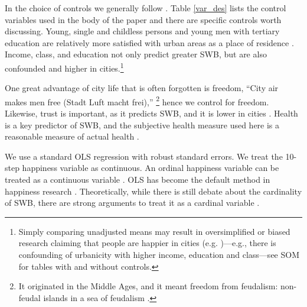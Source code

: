 \documentclass[10pt, letterpaper]{article}
\begin{document}




 
In the choice of controls we generally follow \citet{aok20}. Table \ref{var_des} lists the control variables used in the body of the
paper and there are specific controls worth discussing.
%
 Young, single and childless persons and young men with tertiary education are
 relatively more satisfied with urban areas as a place of residence \citep{anon-regional-studies-19}.
Income, class,  and education  not only predict greater
 SWB, but are also confounded and higher in cities.\footnote{Simply comparing
   unadjusted means may result in oversimplified or biased research claiming
   that people are happier in cities (e.g. \citep{burger20})---e.g., there is
   confounding of urbanicity with higher income, education and class---see SOM for tables with and without controls.} 

One great advantage of city life that is often forgotten is freedom, ``City
 air makes men free (Stadt Luft macht frei),'' \citep[p. 12]{park84}\footnote{It originated in the Middle Ages, and it meant freedom from feudalism: non-feudal islands in a sea of feudalism \citep{harvey12}.} hence we control for freedom. 
% 
Likewise, trust is important, as it predicts SWB, and it is lower in cities
 \citep{milgram70}.
%
Health is a key predictor of SWB, and the subjective health measure used here is a reasonable measure of actual health \citep{subramanian09b}.

We use a standard OLS regression with robust standard errors.  We treat the 10-step
happiness variable as continuous. An ordinal happiness variable can be treated as a
continuous variable \citep{carbonell04}.
%
OLS has become the default method in happiness research
\citep{blanchflower11}. Theoretically, while there is still debate about the
cardinality of SWB, there are strong arguments to treat it as a cardinal
variable \citep{ng96,ng97}. 
\end{document}
